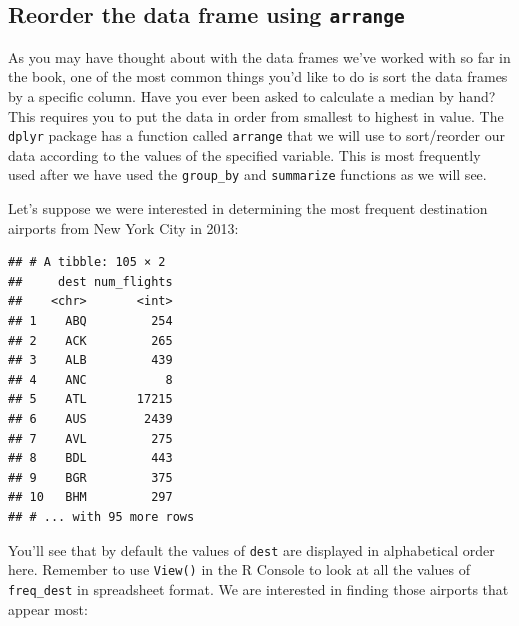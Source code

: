 \documentclass[]{tufte-book}
\newenvironment{Shaded}{\begin{snugshade}}{\end{snugshade}}
\newcommand{\KeywordTok}[1]{\textcolor[rgb]{0.13,0.29,0.53}{\textbf{{#1}}}}
\newcommand{\DataTypeTok}[1]{\textcolor[rgb]{0.13,0.29,0.53}{{#1}}}
\newcommand{\StringTok}[1]{\textcolor[rgb]{0.31,0.60,0.02}{{#1}}}
\newcommand{\NormalTok}[1]{{#1}}
\begin{document}
\subsection{\texorpdfstring{Reorder the data frame using
\texttt{arrange}}{Reorder the data frame using arrange}}\label{reorder-the-data-frame-using-arrange}

As you may have thought about with the data frames we've worked with so
far in the book, one of the most common things you'd like to do is sort
the data frames by a specific column. Have you ever been asked to
calculate a median by hand? This requires you to put the data in order
from smallest to highest in value. The \texttt{dplyr} package has a
function called \texttt{arrange} that we will use to sort/reorder our
data according to the values of the specified variable. This is most
frequently used after we have used the \texttt{group\_by} and
\texttt{summarize} functions as we will see.

Let's suppose we were interested in determining the most frequent
destination airports from New York City in 2013:

\begin{Shaded}
\end{Shaded}

\begin{verbatim}
## # A tibble: 105 × 2
##     dest num_flights
##    <chr>       <int>
## 1    ABQ         254
## 2    ACK         265
## 3    ALB         439
## 4    ANC           8
## 5    ATL       17215
## 6    AUS        2439
## 7    AVL         275
## 8    BDL         443
## 9    BGR         375
## 10   BHM         297
## # ... with 95 more rows
\end{verbatim}

You'll see that by default the values of \texttt{dest} are displayed in
alphabetical order here. Remember to use \texttt{View()} in the R
Console to look at all the values of \texttt{freq\_dest} in spreadsheet
format. We are interested in finding those airports that appear most:

\begin{Shaded}
\end{Shaded}
\end{document}
